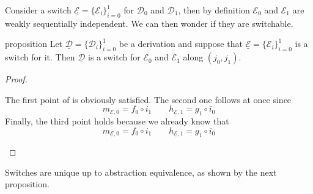 \documentclass[a4paper,UKenglish,cleveref,pdftex, thm-restate,numberwithinsect]{lipics}
\newcommand{\dder}[1]{\mathscr{#1}}
\newcommand{\der}[1]{\underline{\dder{#1}}}
\begin{document}
Consider a switch $\der{E}=\{\dder{E}_i\}_{i=0}^1$ for $\dder{D}_0$ and $\dder{D}_1$, then by definition $\dder{E}_0$ and $\dder{E}_1$ are weakly sequentially independent. We can then wonder if they are switchable.

\begin{theoremEnd}[category=sec3]{proposition}\label{prop:switch}
	Let $\der{D}=\{\dder{D}_i\}_{i=0}^1$ be a derivation and suppose that $\der{E}=\{\dder{E}_i\}_{i=0}^1$ is a switch for it. Then $\der{D}$ is a switch for $\dder{E}_0$ and $\dder{E}_1$ along $(j_0, j_1)$.
\end{theoremEnd}
\begin{proof}\begin{proofEnd}
	The first point of  is obviously satisfied. The second one follows at once since 
	\[m_{\der{E},0}= f_0\circ i_1 \qquad h_{\der{E},1}= g_{1}\circ i_0\]
	Finally, the third point holds because we already know that 
\[m_{\der{E},0}= f_0\circ i_1 \qquad h_{\der{E},1}= g_{1}\circ i_0\]
	\end{proofEnd}
\end{proof}

Switches are unique up to abstraction equivalence, as shown by the next proposition.
\end{document}
